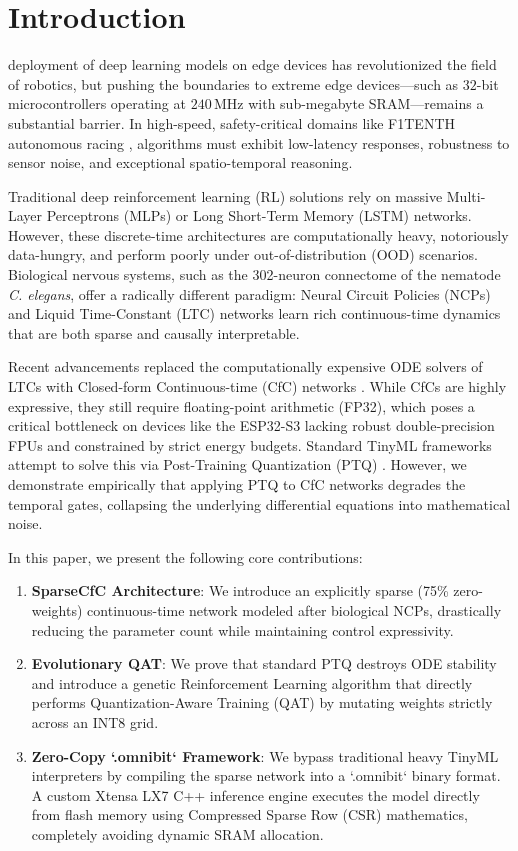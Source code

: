 \documentclass[lettersize,journal]{IEEEtran}
\begin{document}
\section{Introduction}
 deployment of deep learning models on edge devices has revolutionized the field of robotics, but pushing the boundaries to extreme edge devices---such as $32$-bit microcontrollers operating at $240$\,MHz with sub-megabyte SRAM---remains a substantial barrier. In high-speed, safety-critical domains like F1TENTH autonomous racing \cite{okelly2020f1tenth}, algorithms must exhibit low-latency responses, robustness to sensor noise, and exceptional spatio-temporal reasoning.

Traditional deep reinforcement learning (RL) solutions rely on massive Multi-Layer Perceptrons (MLPs) or Long Short-Term Memory (LSTM) networks. However, these discrete-time architectures are computationally heavy, notoriously data-hungry, and perform poorly under out-of-distribution (OOD) scenarios. Biological nervous systems, such as the 302-neuron connectome of the nematode \textit{C. elegans}, offer a radically different paradigm: Neural Circuit Policies (NCPs) \cite{lechner2020neural} and Liquid Time-Constant (LTC) networks \cite{hasani2021liquid} learn rich continuous-time dynamics that are both sparse and causally interpretable. 

Recent advancements replaced the computationally expensive ODE solvers of LTCs with Closed-form Continuous-time (CfC) networks \cite{hasani2022closed}. While CfCs are highly expressive, they still require floating-point arithmetic (FP32), which poses a critical bottleneck on devices like the ESP32-S3 lacking robust double-precision FPUs and constrained by strict energy budgets. Standard TinyML frameworks attempt to solve this via Post-Training Quantization (PTQ) \cite{david2021tensorflow}. However, we demonstrate empirically that applying PTQ to CfC networks degrades the temporal gates, collapsing the underlying differential equations into mathematical noise.

In this paper, we present the following core contributions:
\begin{enumerate}
    \item \textbf{SparseCfC Architecture}: We introduce an explicitly sparse (75\% zero-weights) continuous-time network modeled after biological NCPs, drastically reducing the parameter count while maintaining control expressivity.
    \item \textbf{Evolutionary QAT}: We prove that standard PTQ destroys ODE stability and introduce a genetic Reinforcement Learning algorithm that directly performs Quantization-Aware Training (QAT) by mutating weights strictly across an INT8 grid.
    \item \textbf{Zero-Copy `.omnibit` Framework}: We bypass traditional heavy TinyML interpreters by compiling the sparse network into a `.omnibit` binary format. A custom Xtensa LX7 C++ inference engine executes the model directly from flash memory using Compressed Sparse Row (CSR) mathematics, completely avoiding dynamic SRAM allocation.
\end{enumerate}
\end{document}
